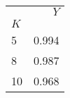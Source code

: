 \begin{tabular}{lr}
\toprule
{} &    $Y$ \\
$K$ &        \\
\midrule
5   &  0.994 \\
8 &  0.987 \\
10 &  0.968 \\
\bottomrule
\end{tabular}
